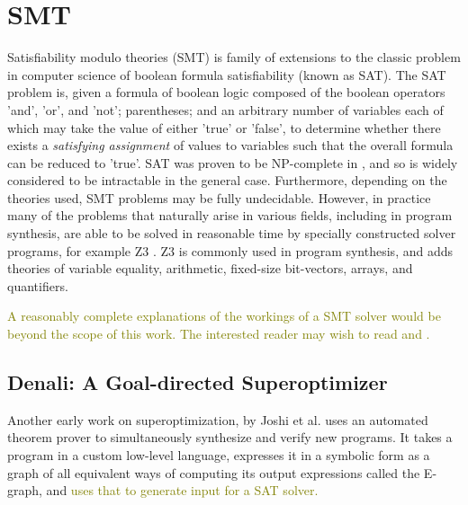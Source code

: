 \documentclass[12pt,twoside]{reedthesis}
\newcommand{\green}[1]{\textcolor{olive}{#1}}
\newcommand{\addressed}[2]{{#1}}
\begin{document}
    \section{SMT}
        Satisfiability modulo theories (SMT) is family of extensions to the classic problem in computer science of boolean formula satisfiability (known as SAT).
        The SAT problem is, given a formula of boolean logic composed of 
                the boolean operators 'and', 'or', and 'not';
                parentheses;
                and an arbitrary number of variables each of which may take the value of either 'true' or 'false',
            to determine whether there exists a \textit{satisfying assignment} of values to variables such that the overall formula can be reduced to 'true'.
        SAT was proven to be NP-complete in \cite{cook1971sat}, and so is widely considered to be intractable in the general case.
        Furthermore, depending on the theories used, SMT problems may be fully undecidable.
        However, in practice many of the problems that naturally arise in various fields, including in program synthesis, are able to be solved in reasonable time by specially constructed solver programs, for example Z3 \cite{demoura2008z3}.
        Z3 is commonly used in program synthesis, and adds theories of variable equality, arithmetic, fixed-size bit-vectors, arrays, and quantifiers.

        \green{
        A reasonably complete explanations of the workings of a SMT solver would be beyond the scope of this work.
        The interested reader may wish to read \cite{demoura2008z3} and \cite{dpll1962theorem}.
        }

        \subsection{Denali: A Goal-directed Superoptimizer}
            Another early work on superoptimization, by Joshi et al. \cite{joshi2002denali} uses an automated theorem prover to simultaneously synthesize and verify new programs.
            It takes a program in a custom low-level language, expresses it in a symbolic form as a graph of all equivalent ways of computing its output expressions
                \addressed{called the E-graph}{I would be inclined to have a separate description of E-graphs, but it depends on the structure of the section},
                and \green{uses that to generate input for a SAT solver.}
            
\end{document}
